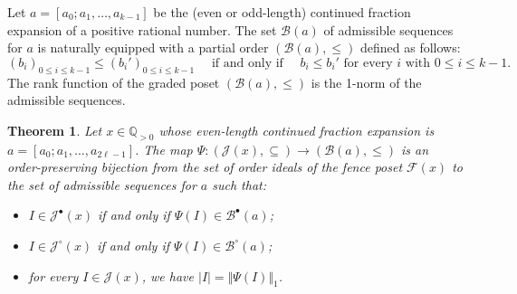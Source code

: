 \documentclass[a4paper,12pt]{amsart}
\newtheorem{theorem}[definition]{Theorem}
\newcommand{\Q}{\mathbb{Q}}
\newcommand{\xx}{{x}}
\newcommand{\Bcal}{{\mathcal{B}}}
\newcommand{\Fcal}{{\mathcal{F}}}
\newcommand{\Jcal}{{\mathcal{J}}}
\newcommand{\0}{\mathtt{0}}
\newcommand{\1}{\mathtt{1}}
\newcommand{\2}{\mathtt{2}}
\newcommand{\3}{\mathtt{3}}
\newcommand{\size}[1]{
    {|#1|}                 %
}
\begin{document}
Let $a=[a_0; a_1, \dots, a_{k-1}]$ be the (even or odd-length) continued
fraction expansion of a positive rational number.
The set $\Bcal(a)$ of admissible sequences for $a$
is naturally equipped with a partial order
$(\Bcal(a), \leq)$ defined as follows:
\[
     (b_i)_{0\leq i\leq k-1}
     \leq
     (b_i')_{0\leq i\leq k-1}
    \quad
    \text{ if and only if }
    \quad
    b_i\leq b_i'
    \text{ for every $i$ with }
    0\leq i\leq k-1.
\]
The rank function of the graded poset $(\Bcal(a), \leq)$ is the 1-norm of the
admissible sequences.


%

\begin{theorem}\label{thm:bijection-order-ideals-to-integersequences}
    Let $x\in\Q_{>0}$ whose
even-length continued fraction expansion is $a=[a_0;a_1,\dots,a_{2\ell-1}]$.
    The map $\Psi:(\Jcal(\xx),\subseteq)\to(\Bcal(a),\leq)$ is an order-preserving bijection from
the set of order ideals of the fence poset $\Fcal(\xx)$
to the set of admissible sequences for $a$
such that:
\begin{itemize}
\item $I\in \Jcal^\bullet(\xx)$ if and only if $\Psi(I)\in \Bcal^\bullet(a)$;
\item $I\in \Jcal^\circ(\xx)$  if and only if $\Psi(I)\in \Bcal^\circ(a)$;
\item for every $I\in \Jcal(\xx)$, we have $\size{I} = \Vert\Psi(I)\Vert_1$.
\end{itemize}
\end{theorem}
\end{document}
